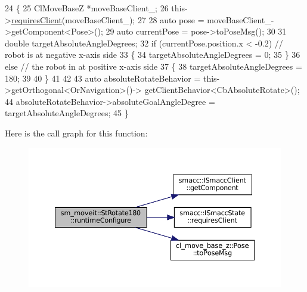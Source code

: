 \begin{DoxyCode}
24     \{
25         ClMoveBaseZ *moveBaseClient\_;
26         this->\hyperlink{classsmacc_1_1ISmaccState_a7f95c9f0a6ea2d6f18d1aec0519de4ac}{requiresClient}(moveBaseClient\_);
27 
28         \textcolor{keyword}{auto} pose = moveBaseClient\_->getComponent<Pose>();
29         \textcolor{keyword}{auto} currentPose = pose->toPoseMsg();
30 
31         \textcolor{keywordtype}{double} targetAbsoluteAngleDegrees;
32         \textcolor{keywordflow}{if} (currentPose.position.x < -0.2) \textcolor{comment}{// robot is at negative x-axis side}
33         \{
34                 targetAbsoluteAngleDegrees = 0;
35         \}
36         \textcolor{keywordflow}{else} \textcolor{comment}{// the robot in at positive x-axis side}
37         \{
38                 targetAbsoluteAngleDegrees = 180;
39              
40         \}
41 
42         
43         \textcolor{keyword}{auto} absoluteRotateBehavior = this->getOrthogonal<OrNavigation>()->
      getClientBehavior<CbAbsoluteRotate>();
44         absoluteRotateBehavior->absoluteGoalAngleDegree = targetAbsoluteAngleDegrees;
45     \}
\end{DoxyCode}
Here is the call graph for this function\+:
\nopagebreak
\begin{figure}[H]
\begin{center}
\leavevmode
\includegraphics[width=350pt]{structsm__moveit_1_1StRotate180_af424dc219c107d5c3678c6fc915d9c68_cgraph}
\end{center}
\end{figure}
\mbox{\label{structsm__moveit_1_1StRotate180_a7ce91eeeb1a8740e1a6f797a41dc940a}} 
